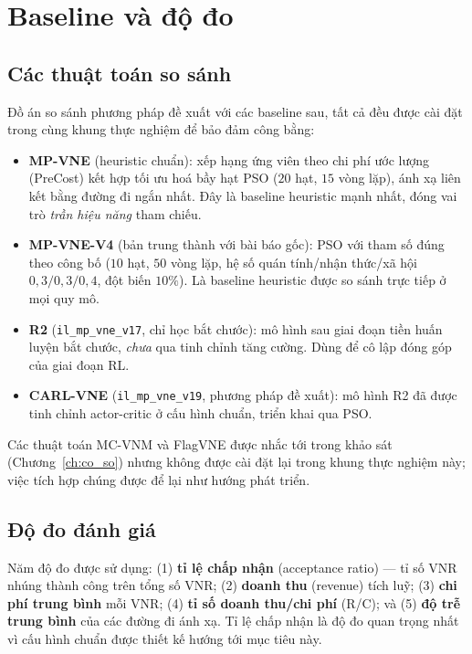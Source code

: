 \documentclass[../DoAn.tex]{subfiles}
\begin{document}
\section{Baseline và độ đo}                 %
\label{sec:baselines}

\subsection{Các thuật toán so sánh}
\label{subsec:baseline-algos}

Đồ án so sánh phương pháp đề xuất với các baseline sau, tất cả đều được cài đặt trong cùng khung thực nghiệm để bảo đảm công bằng:

\begin{itemize}
\item \textbf{MP-VNE} (heuristic chuẩn): xếp hạng ứng viên theo chi phí ước lượng (PreCost) kết hợp tối ưu hoá bầy hạt PSO ($20$ hạt, $15$ vòng lặp), ánh xạ liên kết bằng đường đi ngắn nhất. Đây là baseline heuristic mạnh nhất, đóng vai trò \textit{trần hiệu năng} tham chiếu.
\item \textbf{MP-VNE-V4} (bản trung thành với bài báo gốc): PSO với tham số đúng theo công bố ($10$ hạt, $50$ vòng lặp, hệ số quán tính/nhận thức/xã hội $0{,}3/0{,}3/0{,}4$, đột biến $10\%$). Là baseline heuristic được so sánh trực tiếp ở mọi quy mô.
\item \textbf{R2} (\texttt{il\_mp\_vne\_v17}, chỉ học bắt chước): mô hình sau giai đoạn tiền huấn luyện bắt chước, \textit{chưa} qua tinh chỉnh tăng cường. Dùng để cô lập đóng góp của giai đoạn RL.
\item \textbf{CARL-VNE} (\texttt{il\_mp\_vne\_v19}, phương pháp đề xuất): mô hình R2 đã được tinh chỉnh actor-critic ở cấu hình chuẩn, triển khai qua PSO.
\end{itemize}

Các thuật toán MC-VNM và FlagVNE được nhắc tới trong khảo sát (Chương~\ref{ch:co_so}) nhưng không được cài đặt lại trong khung thực nghiệm này; việc tích hợp chúng được để lại như hướng phát triển.

\subsection{Độ đo đánh giá}
\label{subsec:metrics}

Năm độ đo được sử dụng: (1) \textbf{tỉ lệ chấp nhận} (acceptance ratio) — tỉ số VNR nhúng thành công trên tổng số VNR; (2) \textbf{doanh thu} (revenue) tích luỹ; (3) \textbf{chi phí trung bình} mỗi VNR; (4) \textbf{tỉ số doanh thu/chi phí} (R/C); và (5) \textbf{độ trễ trung bình} của các đường đi ánh xạ. Tỉ lệ chấp nhận là độ đo quan trọng nhất vì cấu hình chuẩn được thiết kế hướng tới mục tiêu này.
\end{document}
